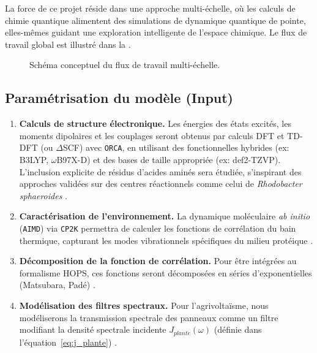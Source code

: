 \documentclass[12pt, a4paper]{article}
\begin{document}
La force de ce projet réside dans une approche multi-échelle, où les calculs de chimie quantique alimentent des simulations de dynamique quantique de pointe, elles-mêmes guidant une exploration intelligente de l'espace chimique. Le flux de travail global est illustré dans la .

\begin{figure}[htb]
\centering
\caption{Schéma conceptuel du flux de travail multi-échelle.}
\label{fig_workflow}

\end{figure}

\subsection{Paramétrisation du modèle (Input)}

\begin{enumerate}
    \item \textbf{Calculs de structure électronique.} Les énergies des états excités, les moments dipolaires et les couplages seront obtenus par calculs DFT et TD-DFT (ou $\Delta$SCF) avec \texttt{ORCA}, en utilisant des fonctionnelles hybrides (ex: B3LYP, $\omega$B97X-D) et des bases de taille appropriée (ex: def2-TZVP). L'inclusion explicite de résidus d'acides aminés sera étudiée, s'inspirant des approches validées sur des centres réactionnels comme celui de \textit{Rhodobacter sphaeroides} \cite{Harush2023}.

    \item \textbf{Caractérisation de l'environnement.} La dynamique moléculaire \textit{ab initio} (\texttt{AIMD}) via \texttt{CP2K} permettra de calculer les fonctions de corrélation du bain thermique, capturant les modes vibrationnels spécifiques du milieu protéique \cite{lee2015, rangel2002}.

    \item \textbf{Décomposition de la fonction de corrélation.} Pour être intégrées au formalisme HOPS, ces fonctions seront décomposées en séries d'exponentielles (Matsubara, Padé) \cite{lambert2023, tao2020}.

    \item \textbf{Modélisation des filtres spectraux.} Pour l'agrivoltaïsme, nous modéliserons la transmission spectrale des panneaux comme un filtre modifiant la densité spectrale incidente $J_{plante}(\omega)$ (définie dans l'équation~\eqref{eq:j_plante}) \cite{Shi2025a}.
\end{enumerate}
\end{document}
